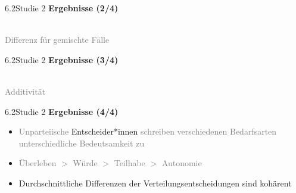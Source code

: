 \documentclass[xcolor=table,9pt,aspectratio=169]{beamer}
\begin{document}
\begin{frame}{\vspace*{10mm}6.2\hspace*{1em}Studie 2}
\textbf{Ergebnisse (2/4)}\\
\bigskip
\begin{center}
   \\
   \footnotesize{\textcolor{gray}{Differenz für gemischte Fälle}}
\end{center}
\end{frame}


\begin{frame}{\vspace*{10mm}6.2\hspace*{1em}Studie 2}
\textbf{Ergebnisse (3/4)}\\
\bigskip
\begin{center}
   \\
   \footnotesize{\textcolor{gray}{Additivität}}
\end{center}
\end{frame}


\begin{frame}{\vspace*{10mm}6.2\hspace*{1em}Studie 2}
\textbf{Ergebnisse (4/4)}\\
\begin{itemize}
   \item \textcolor{gray}{Unparteiische} Entscheider*innen \textcolor{gray}{schreiben verschiedenen Bedarfsarten unterschiedliche Bedeutsamkeit zu}
   \item \textcolor{gray}{Überleben $>$ Würde $>$ Teilhabe $>$ Autonomie}
   \item Durchschnittliche Differenzen der Verteilungsentscheidungen sind kohärent
\end{itemize}
\end{frame}
\end{document}
